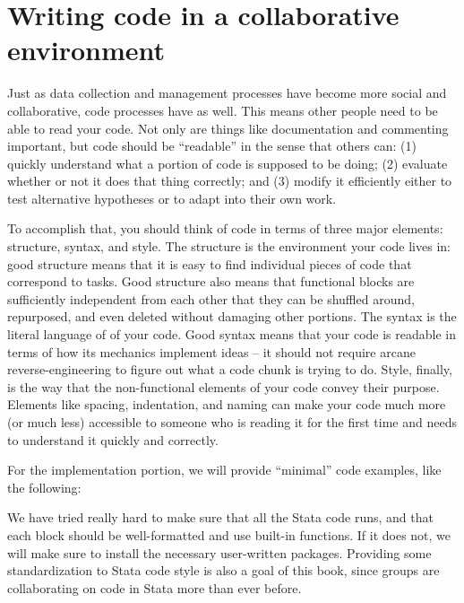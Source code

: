 \section{Writing code in a collaborative environment}

Just as data collection and management processes have become more social and collaborative,
code processes have as well. This means other people need to be able to read your code.
Not only are things like documentation and commenting important,
but code should be ``readable'' in the sense that others can:
(1) quickly understand what a portion of code is supposed to be doing;
(2) evaluate whether or not it does that thing correctly; and
(3) modify it efficiently either to test alternative hypotheses or to adapt into their own work.

To accomplish that, you should think of code in terms of three major elements: structure, syntax, and style.
The structure is the environment your code lives in:
good structure means that it is easy to find individual pieces of code that correspond to tasks.
Good structure also means that functional blocks are sufficiently independent from each other
that they can be shuffled around, repurposed, and even deleted without damaging other portions.
The syntax is the literal language of of your code.
Good syntax means that your code is readable in terms of how its mechanics implement ideas --
it should not require arcane reverse-engineering to figure out what a code chunk is trying to do.
Style, finally, is the way that the non-functional elements of your code convey their purpose.
Elements like spacing, indentation, and naming can make your code much more (or much less)
accessible to someone who is reading it for the first time and needs to understand it quickly and correctly.

For the implementation portion, we will provide ``minimal'' code examples, like the following:


{
}

We have tried really hard to make sure that all the Stata code runs,
and that each block should be well-formatted and use built-in functions.
If it does not, we will make sure to install the necessary user-written packages.
Providing some standardization to Stata code style is also a goal of this book,
since groups are collaborating on code in Stata more than ever before.

